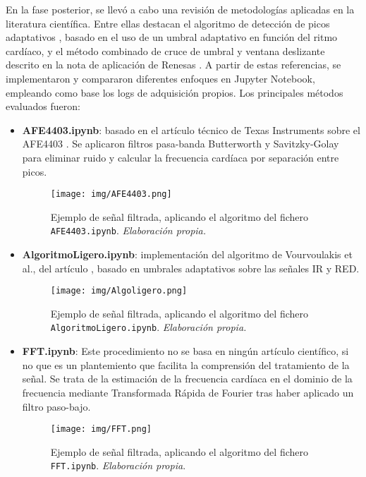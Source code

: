 En la fase posterior, se llevó a cabo una revisión de metodologías aplicadas en la literatura científica. Entre ellas destacan el algoritmo de detección de picos adaptativos \cite{9493400}, basado en el uso de un umbral adaptativo en función del ritmo cardíaco, y el método combinado de cruce de umbral y ventana deslizante descrito en la nota de aplicación de Renesas \cite{renesas2022ob1203}.
A partir de estas referencias, se implementaron y compararon diferentes enfoques en Jupyter Notebook, empleando como base los logs de adquisición propios. Los principales métodos evaluados fueron:


\begin{itemize}
    \item \textbf{AFE4403.ipynb}: basado en el artículo técnico de Texas Instruments sobre el AFE4403 \cite{oak2015how}. Se aplicaron filtros pasa-banda Butterworth y Savitzky-Golay para eliminar ruido y calcular la frecuencia cardíaca por separación entre picos.
    \begin{figure}[H]
        \centering
        \texttt{[image: img/AFE4403.png]}
        \caption{Ejemplo de señal filtrada, aplicando el algoritmo del fichero \texttt{AFE4403.ipynb}. \textit{Elaboración propia.}}
        \label{fig:AFE4403}
    \end{figure}
    \item \textbf{AlgoritmoLigero.ipynb}: implementación del algoritmo de Vourvoulakis et al., del artículo \cite{9493400}, basado en umbrales adaptativos sobre las señales IR y RED.
    \begin{figure}[H]
        \centering
        \texttt{[image: img/Algoligero.png]}
        \caption{Ejemplo de señal filtrada, aplicando el algoritmo del fichero \texttt{AlgoritmoLigero.ipynb}. \textit{Elaboración propia.}}
        \label{fig:AlgoLigero}
    \end{figure}
    \item \textbf{FFT.ipynb}: Este procedimiento no se basa en ningún artículo científico, si no que es un plantemiento que facilita la comprensión del tratamiento de la señal. Se trata de la estimación de la frecuencia cardíaca en el dominio de la frecuencia mediante Transformada Rápida de Fourier tras haber aplicado un filtro paso-bajo.
    \begin{figure}[H]
        \centering
        \texttt{[image: img/FFT.png]}
        \caption{Ejemplo de señal filtrada, aplicando el algoritmo del fichero \texttt{FFT.ipynb}. \textit{Elaboración propia}.}

\end{figure}
\end{itemize}
